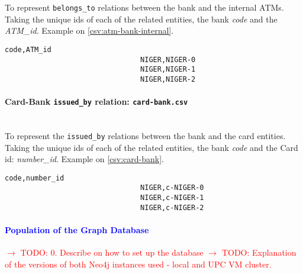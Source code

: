 To represent \texttt{belongs\_to} relations between the bank and the internal ATMs. Taking the unique ids of each of the related entities, the bank \emph{code} and the \emph{ATM\_id}. Example on \ref{csv:atm-bank-internal}.

\begin{center}
\lstset{style=csvStyle}
\begin{lstlisting}[caption={Example of a atm-bank-internal.csv}, label={csv:atm-bank-internal}]
                                code,ATM_id
                                NIGER,NIGER-0
                                NIGER,NIGER-1
                                NIGER,NIGER-2
\end{lstlisting}
\end{center}

\paragraph{Card-Bank \texttt{issued\_by} relation: \texttt{card-bank.csv}\\\\}

To represent the \texttt{issued\_by} relations between the bank and the card entities. Taking the unique ids of each of the related entities, the bank \emph{code} and the Card id: \emph{number\_id}. Example on \ref{csv:card-bank}.

\begin{center}
\lstset{style=csvStyle}
\begin{lstlisting}[caption={Example of a card-bank.csv}, label={csv:card-bank}]
                                code,number_id
                                NIGER,c-NIGER-0
                                NIGER,c-NIGER-1
                                NIGER,c-NIGER-2
\end{lstlisting}
\end{center}

\paragraph{\textcolor{blue}{Population of the Graph Database}\\}


\textcolor{red}{$\rightarrow$ TODO: 0. Describe on how to set up the database}
\textcolor{red}{$\rightarrow$ TODO: Explanation of the versions of both Neo4j instances used - local and UPC VM cluster.}\\

